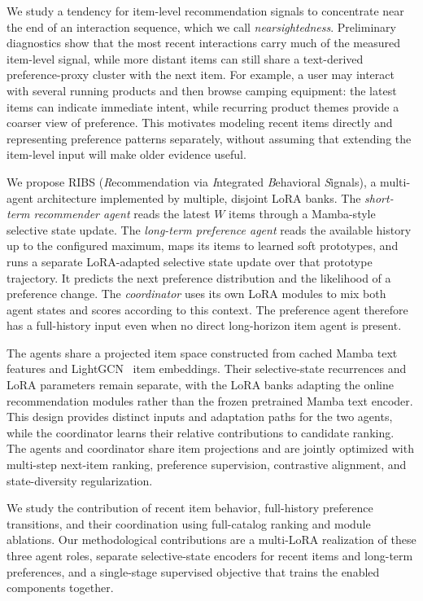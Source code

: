 \documentclass[11pt]{article}
\begin{document}
We study a tendency for item-level recommendation signals to concentrate near the end of an interaction sequence, which we call \emph{nearsightedness}. Preliminary diagnostics show that the most recent interactions carry much of the measured item-level signal, while more distant items can still share a text-derived preference-proxy cluster with the next item. For example, a user may interact with several running products and then browse camping equipment: the latest items can indicate immediate intent, while recurring product themes provide a coarser view of preference. This motivates modeling recent items directly and representing preference patterns separately, without assuming that extending the item-level input will make older evidence useful.

We propose RIBS (\emph{R}ecommendation via \emph{I}ntegrated \emph{B}ehavioral \emph{S}ignals), a multi-agent architecture implemented by multiple, disjoint LoRA banks. The \emph{short-term recommender agent} reads the latest $W$ items through a Mamba-style selective state update. The \emph{long-term preference agent} reads the available history up to the configured maximum, maps its items to learned soft prototypes, and runs a separate LoRA-adapted selective state update over that prototype trajectory. It predicts the next preference distribution and the likelihood of a preference change. The \emph{coordinator} uses its own LoRA modules to mix both agent states and scores according to this context. The preference agent therefore has a full-history input even when no direct long-horizon item agent is present.

The agents share a projected item space constructed from cached Mamba text features and LightGCN~\citep{LightGCN} item embeddings. Their selective-state recurrences and LoRA parameters remain separate, with the LoRA banks adapting the online recommendation modules rather than the frozen pretrained Mamba text encoder. This design provides distinct inputs and adaptation paths for the two agents, while the coordinator learns their relative contributions to candidate ranking. The agents and coordinator share item projections and are jointly optimized with multi-step next-item ranking, preference supervision, contrastive alignment, and state-diversity regularization.

We study the contribution of recent item behavior, full-history preference transitions, and their coordination using full-catalog ranking and module ablations. Our methodological contributions are a multi-LoRA realization of these three agent roles, separate selective-state encoders for recent items and long-term preferences, and a single-stage supervised objective that trains the enabled components together.
\end{document}
